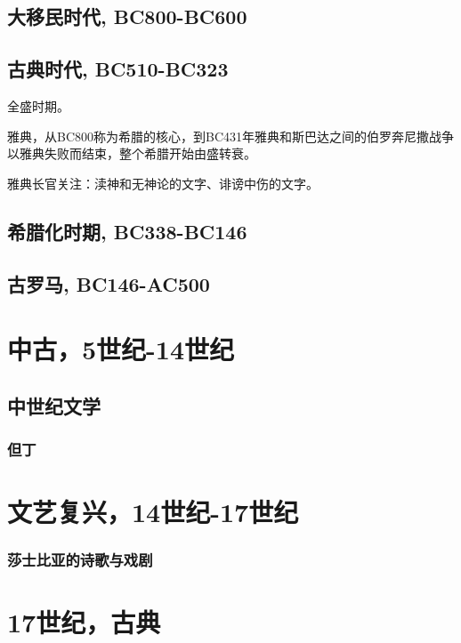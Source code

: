 \documentclass[UTF8]{../RepresentationUniverse}
\begin{document}
\section{大移民时代, BC800-BC600}

\section{古典时代, BC510-BC323}
全盛时期。

雅典，从BC800称为希腊的核心，到BC431年雅典和斯巴达之间的伯罗奔尼撒战争以雅典失败而结束，整个希腊开始由盛转衰。

雅典长官关注：渎神和无神论的文字、诽谤中伤的文字。

\section{希腊化时期, BC338-BC146}


\section{古罗马, BC146-AC500}






\chapter{中古，5世纪-14世纪}
\section{中世纪文学}


\subsection{但丁}



\chapter{文艺复兴，14世纪-17世纪}



\subsection{莎士比亚的诗歌与戏剧}





\chapter{17世纪，古典}
\end{document}
